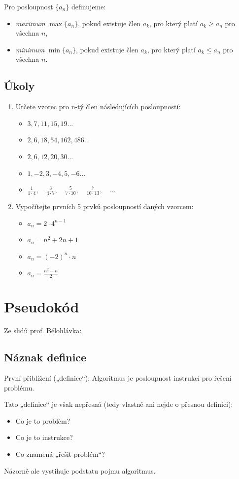 \documentclass[openany,12pt,a4paper]{book}
\begin{document}
\begin{definition}
Pro posloupnost $\{a_n\}$ definujeme:
\begin{itemize}
  \item \emph{maximum} $\max\{a_n\}$, pokud existuje člen $a_k$, pro který platí $a_k \geq a_n$ pro všechna $n$,
  \item \emph{minimum} $\min\{a_n\}$, pokud existuje člen $a_k$, pro který platí $a_k \leq a_n$ pro všechna $n$.
\end{itemize}
\end{definition}


\section{Úkoly}
\begin{enumerate}
	\item Určete vzorec pro n-tý člen následujících posloupností:
		\begin{itemize}
			\item $ 3, 7, 11, 15, 19 ...$
			\item $ 2, 6, 18, 54, 162, 486 ...$
			\item $ 2, 6, 12,20, 30 ... $
			\item $ 1, -2, 3, -4, 5, -6 ...$
			\item $
\frac{1}{1 \cdot 4}, \quad \frac{3}{4 \cdot 7}, \quad \frac{5}{7 \cdot 10}, \quad \frac{7}{10 \cdot 13}, \quad \dots$
		\end{itemize}
	\item Vypočítejte prvních 5 prvků posloupností daných vzorcem:
		\begin{itemize}
			 \item $ a_n = 2 \cdot 4^{n - 1}$
			 \item $ a_n = n^2 + 2n + 1$
			 \item $ a_n = (-2)^n \cdot n$
			 \item $a_n = \frac{n^2 + n}{2}$
		\end{itemize}
\end{enumerate}

\chapter{Pseudokód}
Ze slidů prof. Bělohlávka:

\section{Náznak definice}
\begin{definition}
První přiblížení („definice“):  
Algoritmus je posloupnost instrukcí pro řešení problému.

Tato „definice“ je však nepřesná (tedy vlastně ani nejde o přesnou definici):
\begin{itemize}
	\item Co je to problém?
	\item Co je to instrukce?
	\item Co znamená „řešit problém“?
\end{itemize}

Názorně ale vystihuje podstatu pojmu algoritmus.
\end{definition}
\end{document}
